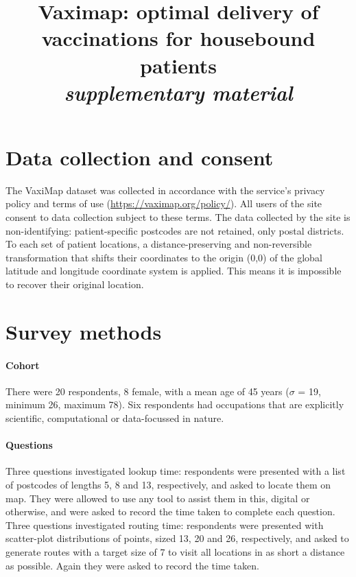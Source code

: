 \documentclass{article}
\def\vm{VaxiMap}
\begin{document}
\linenumbers
\doublespacing

\title{Vaximap: optimal delivery of vaccinations for housebound patients\\
\textit{supplementary material}}
\maketitle

\section{Data collection and consent}

The \vm{} dataset was collected in accordance with the service's privacy policy and terms of use (\hyperlink{https://vaximap.org/policy/}{https://vaximap.org/policy/}). All users of the site consent to data collection subject to these terms. The data collected by the site is non-identifying: patient-specific postcodes are not retained, only postal districts. To each set of patient locations, a distance-preserving and non-reversible transformation that shifts their coordinates to the origin (0,0) of the global latitude and longitude coordinate system is applied. This means it is impossible to recover their original location. 

\section{Survey methods}

\paragraph{Cohort} There were 20 respondents, 8 female, with a mean age of 45 years ($\sigma$ = 19, minimum 26, maximum 78). Six respondents had occupations that are explicitly scientific, computational or data-focussed in nature. 

\paragraph{Questions} Three questions investigated lookup time: respondents were presented with a list of postcodes of lengths 5, 8 and 13, respectively, and asked to locate them on map. They were allowed to use any tool to assist them in this, digital or otherwise, and were asked to record the time taken to complete each question. Three questions investigated routing time: respondents were presented with scatter-plot distributions of points, sized 13, 20 and 26, respectively, and asked to generate routes with a target size of 7 to visit all locations in as short a distance as possible. Again they were asked to record the time taken.
\end{document}
